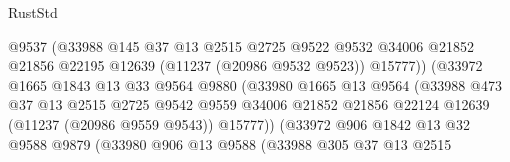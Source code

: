 \begin{lexlean}{RustStd}
\begin{coremodule}
                                    @9537
                                    (@33988
                                      @145
                                      @37
                                      @13
                                      @2515
                                      @2725
                                      @9522
                                      @9532
                                      @34006
                                      @21852
                                      @21856
                                      @22195
                                      @12639
                                      (@11237 (@20986 @9532 @9523))
                                      @15777))
                                  (@33972
                                    @1665
                                    @1843
                                    @13
                                    @33
                                    @9564
                                    @9880
                                    (@33980
                                      @1665
                                      @13
                                      @9564
                                      (@33988
                                        @473
                                        @37
                                        @13
                                        @2515
                                        @2725
                                        @9542
                                        @9559
                                        @34006
                                        @21852
                                        @21856
                                        @22124
                                        @12639
                                        (@11237 (@20986 @9559 @9543))
                                        @15777))
                                    (@33972
                                      @906
                                      @1842
                                      @13
                                      @32
                                      @9588
                                      @9879
                                      (@33980
                                        @906
                                        @13
                                        @9588
                                        (@33988
                                          @305
                                          @37
                                          @13
                                          @2515

\end{coremodule}
\end{lexlean}

